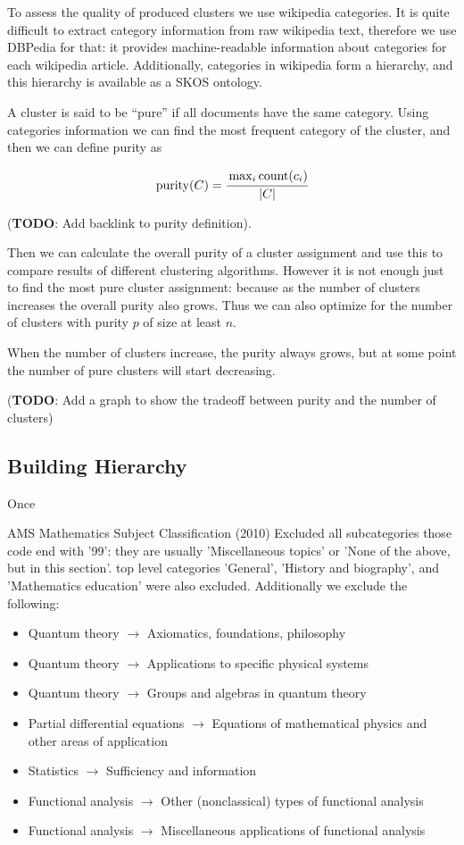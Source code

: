 To assess the quality of produced clusters we use wikipedia categories. It is 
quite difficult to extract category information from raw wikipedia text,
therefore we use DBPedia \cite{bizer2009dbpedia} for that: it provides 
machine-readable information about categories for each wikipedia article. 
Additionally, categories in wikipedia form a hierarchy, and this hierarchy 
is available as a SKOS ontology. 

A cluster is said to be ``pure'' if all documents have the same category. 
Using categories information we can find the most frequent category of the 
cluster, and then we can define purity as 

$$\operatorname{purity}(C) = \cfrac{\max_i \operatorname{count}(c_i)}{|C|}$$

(\textbf{TODO}: Add backlink to purity definition). 

Then we can calculate the overall purity of a cluster assignment and use 
this to compare results of different clustering algorithms. However it is not 
enough just to find the most pure cluster assignment: because as the number 
of clusters increases the overall purity also grows. 
Thus we can also optimize for the number of clusters with purity $p$ of 
size at least $n$. 

When the number of clusters increase, the purity always grows, but at 
some point the number of pure clusters will start decreasing. 

(\textbf{TODO}:  Add a graph to show the tradeoff between purity and the number of clusters)



\subsection{Building Hierarchy} \label{sec:hierarchy}


Once 

AMS Mathematics Subject Classification (2010) \cite{ams2010msc}
Excluded all subcategories those code end with '99': they are 
usually 'Miscellaneous topics' or 'None of the above, but in this section'. 
top level categories 'General', 'History and biography', and 'Mathematics education'
were also excluded. 
Additionally we exclude the following: 

\begin{itemize}
\item Quantum theory $\to$ Axiomatics, foundations, philosophy
\item Quantum theory $\to$ Applications to specific physical systems
\item Quantum theory $\to$ Groups and algebras in quantum theory
\item Partial differential equations $\to$ Equations of mathematical physics and other areas of application
\item Statistics $\to$ Sufficiency and information
\item Functional analysis $\to$ Other (nonclassical) types of functional analysis
\item Functional analysis $\to$ Miscellaneous applications of functional analysis
\end{itemize}

